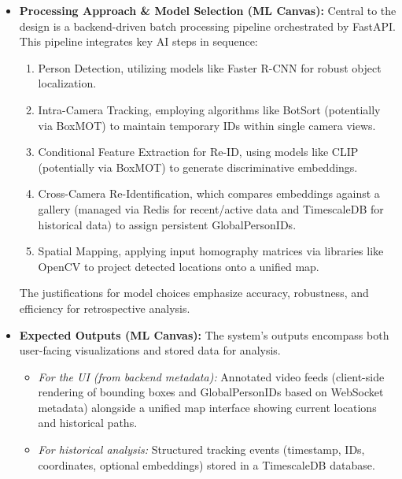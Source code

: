\begin{itemize}
    \item \textbf{Processing Approach \& Model Selection (ML Canvas):}
        Central to the design is a backend-driven batch processing pipeline orchestrated by FastAPI. This pipeline integrates key AI steps in sequence:
        \begin{enumerate}[label=(\Alph*)]
            \item Person Detection, utilizing models like Faster R-CNN for robust object localization.
            \item Intra-Camera Tracking, employing algorithms like BotSort (potentially via BoxMOT) to maintain temporary IDs within single camera views.
            \item Conditional Feature Extraction for Re-ID, using models like CLIP (potentially via BoxMOT) to generate discriminative embeddings.
            \item Cross-Camera Re-Identification, which compares embeddings against a gallery (managed via Redis for recent/active data and TimescaleDB for historical data) to assign persistent GlobalPersonIDs.
            \item Spatial Mapping, applying input homography matrices via libraries like OpenCV to project detected locations onto a unified map.
        \end{enumerate}
        The justifications for model choices emphasize accuracy, robustness, and efficiency for retrospective analysis.

    \item \textbf{Expected Outputs (ML Canvas):}
        The system's outputs encompass both user-facing visualizations and stored data for analysis.
        \begin{itemize}
            \item \textit{For the UI (from backend metadata):} Annotated video feeds (client-side rendering of bounding boxes and GlobalPersonIDs based on WebSocket metadata) alongside a unified map interface showing current locations and historical paths.
            \item \textit{For historical analysis:} Structured tracking events (timestamp, IDs, coordinates, optional embeddings) stored in a TimescaleDB database.
        \end{itemize}


\end{itemize}
